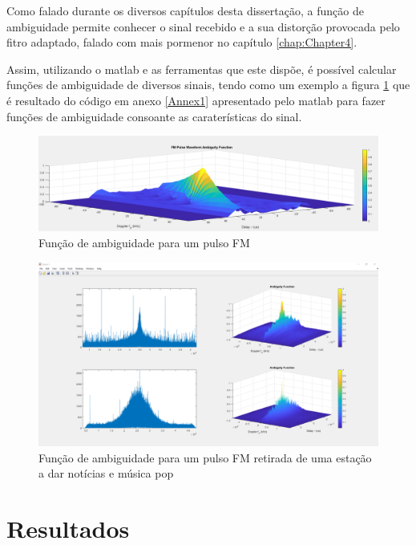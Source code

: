 Como falado durante os diversos capítulos desta dissertação, a função de ambiguidade permite conhecer o sinal recebido e a sua distorção provocada pelo fitro adaptado, falado com mais pormenor no capítulo \ref{chap:Chapter4}. \par
Assim, utilizando o matlab e as ferramentas que este dispõe, é possível calcular funções de ambiguidade de diversos sinais, tendo como um exemplo a figura \ref{fig:ambfun_fmdef} que é resultado do código em anexo \ref{Annex1} apresentado pelo matlab para fazer funções de ambiguidade consoante as caraterísticas do sinal.
\begin{figure}[h]
\centering
\includegraphics[scale=0.4]{chapters/ch5/assets/ambfun_fmdef}
\caption[Função de ambiguidade para um pulso FM]{Função de ambiguidade para um pulso FM}
\label{fig:ambfun_fmdef}
\end{figure}


\begin{figure}[h]
\centering
\includegraphics[scale=0.3]{chapters/ch5/assets/ambfun2}
\caption[Função de ambiguidade para uma estação FM]{Função de ambiguidade para um pulso FM retirada de uma estação a dar notícias e música pop}
\label{fig:ambfun2}
\end{figure}
 


\section{Resultados}


